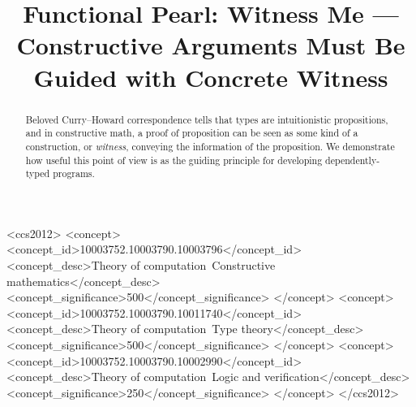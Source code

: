 \documentclass[sigplan,%
  \ifbool{arxiv}{nonacm}{\ifbool{final}{}{review}}
]{acmart}
\begin{document}
\title[Functional Pearl: Witness Me]{Functional Pearl: Witness Me --- Constructive Arguments Must Be Guided with Concrete Witness}



\begin{CCSXML}
<ccs2012>
   <concept>
       <concept_id>10003752.10003790.10003796</concept_id>
       <concept_desc>Theory of computation~Constructive mathematics</concept_desc>
       <concept_significance>500</concept_significance>
       </concept>
   <concept>
       <concept_id>10003752.10003790.10011740</concept_id>
       <concept_desc>Theory of computation~Type theory</concept_desc>
       <concept_significance>500</concept_significance>
       </concept>
   <concept>
       <concept_id>10003752.10003790.10002990</concept_id>
       <concept_desc>Theory of computation~Logic and verification</concept_desc>
       <concept_significance>250</concept_significance>
       </concept>
 </ccs2012>
\end{CCSXML}




\begin{abstract}
  Beloved Curry--Howard correspondence tells that types are intuitionistic propositions, and in constructive math, a proof of proposition can be seen as some kind of a construction, or \emph{witness}, conveying the information of the proposition.
  We demonstrate how useful this point of view is as the guiding principle for developing dependently-typed programs.
\end{abstract}
\end{document}
